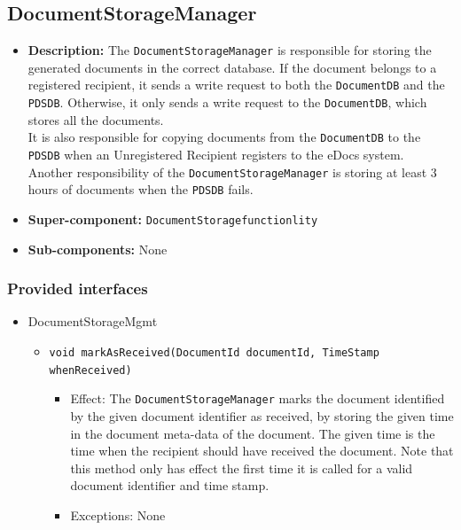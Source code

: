 \documentclass[a4paper,10pt]{article}
\begin{document}
\subsection{DocumentStorageManager}
\begin{itemize}
    \item \textbf{Description:} The \texttt{DocumentStorageManager} is responsible for storing the generated documents in the correct database. If the document belongs to a registered recipient, it sends a write request to both the \texttt{DocumentDB} and the \texttt{PDSDB}. Otherwise, it only sends a write request to the \texttt{DocumentDB}, which stores all the documents.\\
    It is also responsible for copying documents from the \texttt{DocumentDB} to the \texttt{PDSDB} when an Unregistered Recipient registers to the eDocs system.\\ Another responsibility of the \texttt{DocumentStorageManager} is storing at least 3 hours of documents when the \texttt{PDSDB} fails.
    \item \textbf{Super-component:} \texttt{DocumentStoragefunctionlity}
    \item \textbf{Sub-components:} None
\end{itemize}

\subsubsection*{Provided interfaces}
\begin{itemize}
    \item DocumentStorageMgmt
    \begin{itemize}
        \item \texttt{void markAsReceived(DocumentId documentId, TimeStamp whenReceived)}
        \begin{itemize}
            \item Effect: The \texttt{DocumentStorageManager} marks the document identified by the given document identifier as received, by storing the given time in the document meta-data of the document. The given time is the time when the recipient should have received the document. Note that this method only has effect the first time it is called for a valid document identifier and time stamp.
            \item Exceptions: None
        \end{itemize}
    \end{itemize}
\end{itemize}
\end{document}
